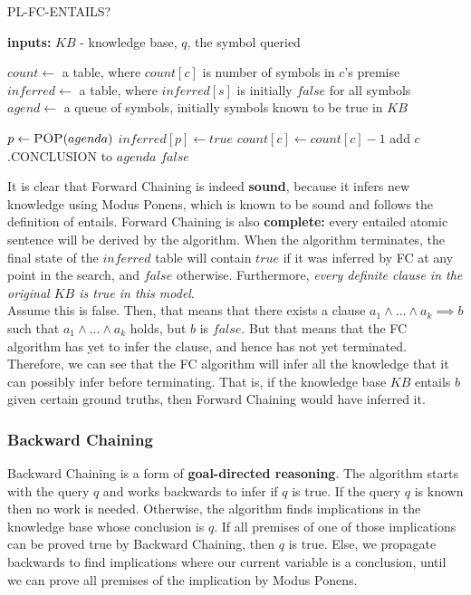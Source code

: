 \documentclass[12pt]{article}
\begin{document}
\begin{algorithm}
\caption{\textsc{PL-FC-ENTAILS?}}\label{euclid}
\begin{algorithmic}[1]
\State \textbf{inputs: } $KB$ - knowledge base, $q$, the symbol queried

\State $count \leftarrow$ a table, where $count[c]$ is number of symbols in $c$'s premise
\State $inferred \leftarrow$ a table, where $inferred[s]$ is initially $false$ for all symbols
\State $agend \leftarrow$ a queue of symbols, initially symbols known to be true in $KB$

\State $p \leftarrow \textsc{POP}(agenda)$
 
\EndIf
{}
\State $inferred[p] \leftarrow true$
\State $count[c] \leftarrow count[c] - 1$
 add $c$.\textsc{CONCLUSION} to $agenda$
\EndIf
\EndFor
\EndIf
\EndWhile
\State \Return $false$
\end{algorithmic}
\end{algorithm}

It is clear that Forward Chaining is indeed \textbf{sound}, because it infers new knowledge using Modus Ponens, which is known to be sound and follows the definition of entails. Forward Chaining is also \textbf{complete:} every entailed atomic sentence will be derived by the algorithm. When the algorithm terminates, the final state of the $inferred$ table will contain $true$ if it was inferred by FC at any point in the search, and $false$ otherwise. Furthermore, \textit{every definite clause in the original $KB$ is true in this model}.\\

Assume this is false. Then, that means that there exists a clause $a_1 \land ... \land a_k \implies b$ such that $a_1 \land ... \land a_k$ holds, but $b$ is $false$. But that means that the FC algorithm has yet to infer the clause, and hence has not yet terminated. Therefore, we can see that the FC algorithm will infer all the knowledge that it can possibly infer before terminating. That is, if the knowledge base $KB$ entails $b$ given certain ground truths, then Forward Chaining would have inferred it.

\subsubsection{Backward Chaining}

Backward Chaining is a form of \textbf{goal-directed reasoning}. The algorithm starts with the query $q$ and works backwards to infer if $q$ is true. If the query $q$ is known then no work is needed. Otherwise, the algorithm finds implications in the knowledge base whose conclusion is $q$. If all premises of one of those implications can be proved true by Backward Chaining, then $q$ is true. Else, we propagate backwards to find implications where our current variable is a conclusion, until we can prove all premises of the implication by Modus Ponens.\\
\end{document}
